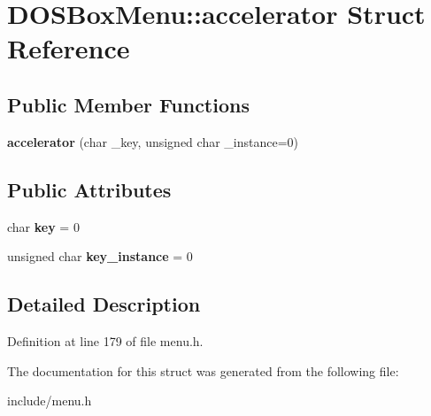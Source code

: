 \hypertarget{structDOSBoxMenu_1_1accelerator}{\section{D\-O\-S\-Box\-Menu\-:\-:accelerator Struct Reference}
\label{structDOSBoxMenu_1_1accelerator}
}
\subsection*{Public Member Functions}
\begin{DoxyCompactItemize}
\item 
\hypertarget{structDOSBoxMenu_1_1accelerator_aa61f9898a302bd155bfe72cd04a93d33}{{\bfseries accelerator} (char \-\_\-key, unsigned char \-\_\-instance=0)}\label{structDOSBoxMenu_1_1accelerator_aa61f9898a302bd155bfe72cd04a93d33}

\end{DoxyCompactItemize}
\subsection*{Public Attributes}
\begin{DoxyCompactItemize}
\item 
\hypertarget{structDOSBoxMenu_1_1accelerator_a84a5ea4d13efd91652a5030c4fa354f2}{char {\bfseries key} = 0}\label{structDOSBoxMenu_1_1accelerator_a84a5ea4d13efd91652a5030c4fa354f2}

\item 
\hypertarget{structDOSBoxMenu_1_1accelerator_a14373aa330474bfbe946ad600aadc3b2}{unsigned char {\bfseries key\-\_\-instance} = 0}\label{structDOSBoxMenu_1_1accelerator_a14373aa330474bfbe946ad600aadc3b2}

\end{DoxyCompactItemize}


\subsection{Detailed Description}


Definition at line 179 of file menu.\-h.



The documentation for this struct was generated from the following file\-:\begin{DoxyCompactItemize}
\item 
include/menu.\-h\end{DoxyCompactItemize}
